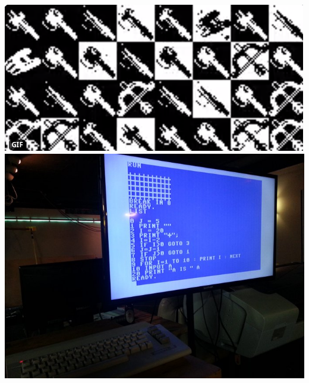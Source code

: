 \documentclass[../resume.tex]{subfiles}
\begin{document}
\noindent
\href{https://twitter.com/randompast/status/722769934485483520}{\includegraphics[scale=0.4]{../fun/iconz.png}}
\href{https://twitter.com/randompast/status/885144483385536512}{\includegraphics[scale=0.2]{../fun/c64.jpeg}}
\end{document}
